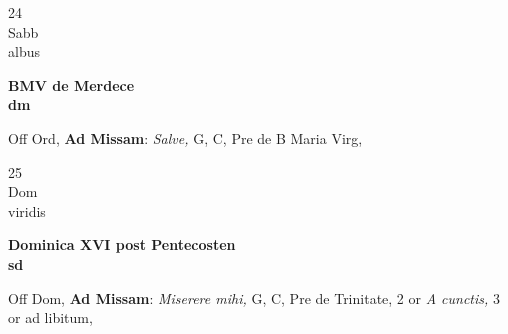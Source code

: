 \documentclass[10pt, openany]{book}
\begin{document}
        \begin{center}
            \begin{minipage}{3.5in}
                \vspace{2em}
                \begin{minipage}{0.5in}
                    {\Huge 24} \\
                    {\normalsize Sabb} \\
                    {\normalsize albus}
                \end{minipage}
                \begin{minipage}{3.0in}
                    \textbf{ \large BMV de Merdece \\
                    \textnormal{\normalsize dm}} \\ 
                \end{minipage}
                \begin{justify}Off Ord, \textbf{Ad Missam}: \textit{Salve,} G, C, Pre de B Maria Virg,   
                \end{justify}
            \end{minipage}
        \end{center}
    
        \begin{center}
            \begin{minipage}{3.5in}
                \vspace{2em}
                \begin{minipage}{0.5in}
                    {\Huge 25} \\
                    {\normalsize Dom} \\
                    {\normalsize viridis}
                \end{minipage}
                \begin{minipage}{3.0in}
                    \textbf{ \large Dominica XVI post Pentecosten \\
                    \textnormal{\normalsize sd}} \\ 
                \end{minipage}
                \begin{justify}Off Dom, \textbf{Ad Missam}: \textit{Miserere mihi,} G, C, Pre de Trinitate, 2 or \textit{A cunctis,} 3 or ad libitum,   
                \end{justify}
            \end{minipage}
        \end{center}
    
\end{document}
